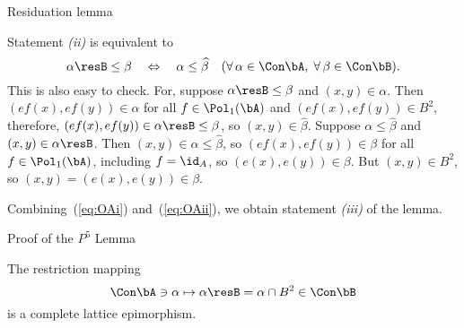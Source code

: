 \begin{frame}[fragile,label=P5Lemma]{Residuation lemma}
{{Statement {\it (ii)} is equivalent to 
  \begin{equation}
    \label{eq:OAii}
    \alpha\resB\leq \beta 
    \quad \Leftrightarrow \quad 
    \alpha \leq \widehat{\beta}
    \quad (\forall \, \alpha \in \Con\bA,\; \forall \, \beta \in \Con\bB).
  \end{equation}
  This is also easy to check.  For, suppose
  $\alpha\resB\leq \beta$ and $(x,y)\in \alpha$. Then $(ef(x), ef(y)) \in \alpha$
  for all $f \in \Pol_1(\bA)$ and $(ef(x), ef(y)) \in B^2$, therefore, 
  $(ef(x), ef(y)) \in \alpha\resB \leq \beta$, so $(x,y) \in \widehat{\beta}$.
  Suppose $\alpha \leq \widehat{\beta}$ and $(x,y) \in \alpha\resB$. 
  Then $(x,y) \in \alpha \leq  \widehat{\beta}$, so 
  $(ef(x), ef(y)) \in \beta$ for all $f\in \Pol_1(\bA)$, including $f=\id_A$, so 
  $(e(x), e(y)) \in \beta$. But $(x, y) \in B^2$, so $(x, y) = (e(x), e(y)) \in
  \beta$.

  Combining~(\ref{eq:OAi}) and~(\ref{eq:OAii}), we obtain statement {\it (iii)} of the lemma.}
}


\end{frame}



\begin{frame}[fragile,label=P5Lemma]{Proof of the $P^5$ Lemma}
  \begin{lemma}
The restriction mapping 
\[
\Con\bA \ni \alpha \mapsto \alpha\resB = \alpha \cap B^2 \in \Con \bB
\]
is a complete lattice epimorphism. %
  \end{lemma}


\end{frame}



